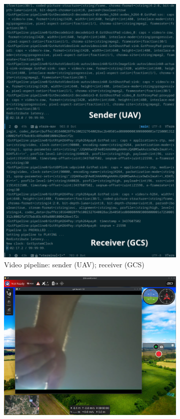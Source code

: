 \begin{figure}[htb!]
\begin{subfigure}[t]{.48\textwidth}
    \includegraphics[width=1.0\textwidth]{./img/png/px4-qgc-cam-3}
  \caption{Video pipeline: sender (UAV); receiver (GCS)}%
  \label{fig:px4-qgc-cam-3}
  \end{subfigure}
%
  \begin{subfigure}[t]{.48\textwidth}
    \includegraphics[width=1.0\textwidth]{./img/png/px4-qgc-cam-1}

\end{subfigure}
\end{figure}
